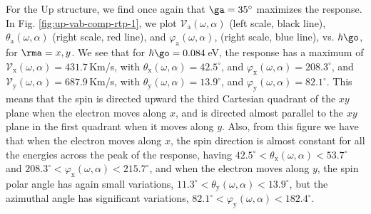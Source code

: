 \documentclass[floatfix,prb,aps,superscriptaddress,showpacs,11pt,preprint,letterpaper]{revtex4}
\begin{document}
For the Up structure, we find once again that  $\ga=35^{\circ}$ maximizes the
response. In Fig. \ref{fig:up-vab-comp-rtp-1}, we plot $\mathcal{V}_{\mathrm{a}}
(\omega,\alpha)$ (left scale, black line), $\theta_{\mathrm{a}}
(\omega,\alpha)$ (right scale, red line), and $\varphi_{\mathrm{a}}
(\omega,\alpha)$, (right scale, blue line), vs. $\hbar\go$, for $\rma=x,y$. 
% 
We see that for $\hbar\go=0.084$\,eV, the response has a maximum of
$\mathcal{V}_{\mathrm{x}} (\omega,\alpha)=431.7$\,Km/s, with
$\theta_{\mathrm{x}}(\omega,\alpha) = 42.5^{\circ}$, and
$\varphi_{\mathrm{x}}(\omega,\alpha) = 208.3^{\circ}$, and
$\mathcal{V}_{\mathrm{y}} (\omega,\alpha)=687.9$\,Km/s, with
$\theta_{\mathrm{y}}(\omega,\alpha) = 13.9^{\circ}$, and
$\varphi_{\mathrm{y}} (\omega,\alpha) = 82.1^{\circ}$. This means that the
spin is directed upward the third Cartesian quadrant of the $xy$ plane when the
electron moves along $x$, and is directed almost parallel to the $xy$ plane in
the first quadrant when it moves along $y$. 
% 
Also, from this figure we have that when the electron moves along $x$, the spin
direction is almost constant for all the energies across the peak of the
response, having
$42.5^{\circ}<\theta_{\mathrm{x}}(\omega,\alpha)<53.7^{\circ}$ and
$208.3^{\circ}<\varphi_{\mathrm{x}}(\omega,\alpha)<215.7^{\circ}$, and when
the electron moves along $y$, the spin polar angle has again small variations,
$11.3^{\circ}< \theta_{\mathrm{y}}(\omega,\alpha)<13.9^{\circ}$, but the
azimuthal angle has significant variations, $82.1^{\circ}<
\varphi_{\mathrm{y}}(\omega,\alpha)<182.4^{\circ}$.
\end{document}
